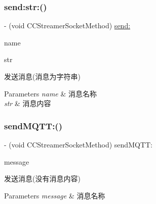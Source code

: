 \subsubsection{\texorpdfstring{send\+:str\+:()}{send:str:()}}
{\footnotesize\ttfamily -\/ (void C\+C\+Streamer\+Socket\+Method) \hyperlink{protocol_c_c_streamer_socket_method_01-p_a7ead0de5b325c2bfdb890512aafb18bb}{send\+:} \begin{DoxyParamCaption}\item[{(N\+S\+String $\ast$)}]{name }\item[{str:(N\+S\+String $\ast$)}]{str }\end{DoxyParamCaption}}

发送消息(消息为字符串)


\begin{DoxyParams}{Parameters}
{\em name} & 消息名称 \\
\hline
{\em str} & 消息内容 \\
\hline
\end{DoxyParams}
\mbox{\label{protocol_c_c_streamer_socket_method_01-p_a5a012fcd5690c87011d03ab31330217c}} 
\subsubsection{\texorpdfstring{send\+M\+Q\+T\+T\+:()}{sendMQTT:()}}
{\footnotesize\ttfamily -\/ (void C\+C\+Streamer\+Socket\+Method) send\+M\+Q\+T\+T\+: \begin{DoxyParamCaption}\item[{(N\+S\+String $\ast$)}]{message }\end{DoxyParamCaption}}

发送消息(没有消息内容)


\begin{DoxyParams}{Parameters}
{\em message} & 消息名称 \\
\hline
\end{DoxyParams}
\mbox{\label{protocol_c_c_streamer_socket_method_01-p_a944b91cb987fa84a5b904fcb3f7afe05}} 
